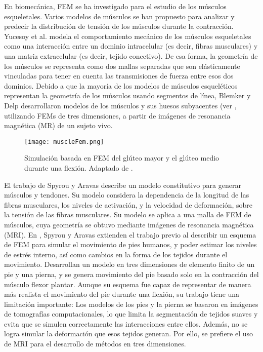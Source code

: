 En biomecánica, FEM se ha investigado para el estudio de los músculos esqueletales. Varios modelos de músculos se han propuesto para analizar y predecir la distribución de tensión de los músculos durante la contracción. Yucesoy et al. \cite{yucesoy2002three} modela el comportamiento mecánico de los músculos esqueletales como una interacción entre un dominio intracelular (es decir, fibras musculares) y una matriz extracelular (es decir, tejido conectivo). De esa forma, la geometría de los músculos se representa como dos mallas separadas que son elásticamente vinculadas para tener en cuenta las transmisiones de fuerza entre esos dos dominios. Debido a que la mayoría de los modelos de músculos esqueléticos representan la geometría de los músculos usando segmentos de línea, Blemker y Delp \citep{blemker2005three} desarrollaron modelos de los músculos y sus huesos subyacentes (ver , utilizando FEMs de tres dimensiones, a partir de imágenes de resonancia magnética (MR) de un sujeto vivo. 

\begin{figure}
	\centering
		\texttt{[image: muscleFem.png]}
	\caption[Simulación basada en FEM del glúteo mayor y el glúteo medio durante una flexión.]{Simulación basada en FEM del glúteo mayor y el glúteo medio durante una flexión. Adaptado de \citep{blemker2005three}.}
		\label{fig:muscleFem}
\end{figure}

El trabajo de Spyrou y Aravas \citep{spyrou2011muscle} describe un modelo constitutivo para generar músculos y tendones. Su modelo considera la dependencia de la longitud de las fibras musculares, los niveles de activación, y la velocidad de deformación, sobre la tensión de las fibras musculares. Su modelo se aplica a una malla de FEM de músculos, cuya geometría se obtuvo mediante imágenes de resonancia magnética (MRI). En \citep{spyrou2012muscle}, Spyrou y Aravas extienden el trabajo previo al describir un esquema de FEM para simular el movimiento de pies humanos, y poder estimar los niveles de estrés interno, así como cambios en la forma de los tejidos durante el movimiento. Desarrollan un modelo en tres dimensiones de elemento finito de un pie y una pierna, y se genera movimiento del pie basado solo en la contracción del músculo flexor plantar. Aunque su esquema fue capaz de representar de manera más realista el movimiento del pie durante una flexión, su trabajo tiene una limitación importante: Los modelos de los pies y la pierna se basaron en imágenes de tomografías computacionales, lo que limita la segmentación de tejidos suaves y evita que se simulen correctamente las interacciones entre ellos. Además, no se logra simular la deformación que esos tejidos generan. Por ello, se prefiere el uso de MRI para el desarrollo de métodos en tres dimensiones. 

